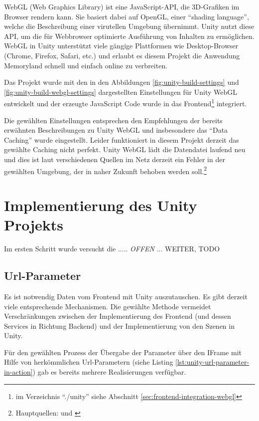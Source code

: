 WebGL (Web Graphics Library) ist eine JavaScript-API, die 3D-Grafiken im Browser rendern kann. Sie basiert dabei auf OpenGL, einer ``shading language'', welche die Beschreibung einer virutellen Umgebung übernimmt. Unity nutzt diese API, um die für Webbrowser optimierte Ausführung von Inhalten zu ermöglichen. WebGL in Unity unterstützt viele gängige Plattformen wie Desktop-Browser (Chrome, Firefox, Safari, etc.) und erlaubt es diesem Projekt die Anwendung Memoryland schnell und einfach online zu verbreiten.


Das Projekt wurde mit den in den Abbildungen \ref{fig:unity-build-settings} und \ref{fig:unity-build-webgl-settings} dargestellten Einstellungen für Unity WebGL entwickelt und der erzeugte JavaScript Code wurde in das Frontend\footnote{im Verzeichnis ``./unity'' siehe Abschnitt \ref{sec:frontend-integration-webgl}} integriert.


Die gewählten Einstellungen entsprechen den Empfehlungen der bereits erwähnten Beschreibungen zu Unity WebGL und insbesondere das ``Data Caching'' wurde eingestellt. Leider funktioniert in diesem Projekt derzeit das gewählte Caching nicht perfekt. Unity WebGL lädt die Datendatei laufend neu und dies ist laut verschiedenen Quellen im Netz derzeit ein Fehler in der gewählten Umgebung, der in naher Zukunft behoben werden soll.\footnote{Hauptquellen: \cite{UnityDocsDataCachingIssue} und \cite{UnityDocsDataCachingIssue2}}


\section{Implementierung des Unity Projekts}

Im ersten Schritt wurde versucht die ..... \emph{OFFEN} ... WEITER, TODO





\subsection{Url-Parameter}
\label{subsec:unity-url-parameter}

Es ist notwendig Daten vom Frontend mit Unity auszutauschen. Es gibt derzeit viele entsprechende Mechanismen. Die gewählte Methode vermeidet Verschränkungen zwischen der Implementierung des Frontend (und dessen Services in Richtung Backend) und der Implementierung von den Szenen in Unity.


Für den gewählten Prozess der Übergabe der Parameter über den IFrame mit Hilfe von herkömmlichen Url-Parametern (siehe Listing \ref{lst:unity-url-parameter-in-action}) gab es bereits mehrere Realisierungen verfügbar. 


